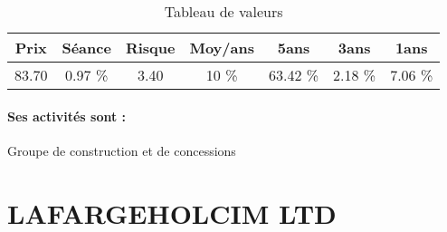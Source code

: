 \documentclass[11pt,a4paper]{report}%
\begin{document}
\begin{table}[H]
  \centering
    \begin{tabular}{|c|c|c|c|c|c|c|}
    \hline
    Prix & Séance & Risque  & Moy/ans & 5ans & 3ans & 1ans \\
    \hline
    83.70 &    0.97 \%    & 3.40 & 10 \% & 63.42 \% & 2.18 \% & 7.06 \% \\
    \hline
    \end{tabular}%
        \label{tab:table_EIFFAGE}%
      \caption{Tableau de valeurs}
\end{table}%

\paragraph{Ses activités sont : } Groupe de construction et de concessions 
    
    \newpage

\section{LAFARGEHOLCIM LTD}
\end{document}
